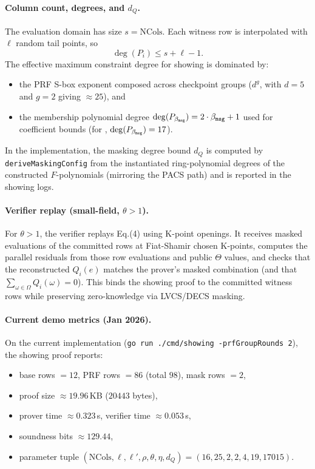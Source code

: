 \paragraph{Column count, degrees, and $d_Q$.}
The evaluation domain has size $s=\mathrm{NCols}$. Each witness row is interpolated with $\ell$ random tail points, so
\[
\deg(P_i)\le s+\ell-1.
\]
The effective maximum constraint degree for showing is dominated by:
\begin{itemize}
  \item the PRF S-box exponent composed across checkpoint groups ($d^g$, with $d=5$ and $g=2$ giving $\approx 25$), and
  \item the membership polynomial degree $\deg(P_{\beta_{\mathtt{msg}}})=2\cdot\beta_{\mathtt{msg}}+1$ used for coefficient bounds
  (for , $\deg(P_{\beta_{\mathtt{msg}}})=17$).
\end{itemize}
In the implementation, the masking degree bound $d_Q$ is computed by \texttt{deriveMaskingConfig} from the instantiated
ring-polynomial degrees of the constructed $F$-polynomials (mirroring the PACS path) and is reported in the showing logs.

\paragraph{Verifier replay (small-field, $\theta>1$).}
For $\theta>1$, the verifier replays Eq.(4) using K-point openings. It receives masked evaluations of the committed rows
at Fiat-Shamir chosen K-points, computes the parallel residuals from those row evaluations and public $\Theta$ values,
and checks that the reconstructed $Q_i(e)$ matches the prover's masked combination (and that
$\sum_{\omega\in\Omega}Q_i(\omega)=0$). This binds the showing proof to the committed witness rows while preserving
zero-knowledge via LVCS/DECS masking.

\paragraph{Current demo metrics (Jan 2026).}
On the current implementation (\texttt{go run ./cmd/showing -prfGroupRounds 2}), the showing proof reports:
\begin{itemize}
  \item base rows $=12$, PRF rows $=86$ (total $98$), mask rows $=2$,
  \item proof size $\approx 19.96$\,KB ($20443$ bytes),
  \item prover time $\approx 0.323$\,s, verifier time $\approx 0.053$\,s,
  \item soundness bits $\approx 129.44$,
  \item parameter tuple $(\mathrm{NCols},\ell,\ell',\rho,\theta,\eta,d_Q)=(16,25,2,2,4,19,17015)$.
\end{itemize}
